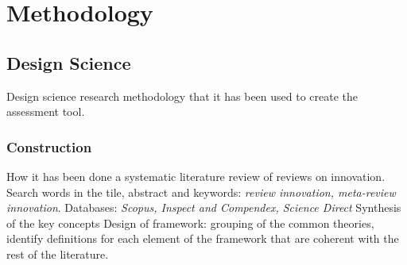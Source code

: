 
\chapter{Methodology} %

\label{Chapter3} %



\section{Design Science}



Design science research methodology that it has been used to create the assessment tool.

\subsection{Construction}
\label{subsec:Construction}
How it has been done a systematic literature review of reviews on innovation. %
Search words in the tile, abstract and keywords: \textit{review innovation, meta-review innovation}. Databases: \textit{Scopus, Inspect and Compendex, Science Direct}
Synthesis of the key concepts
Design of framework: grouping of the common theories, identify definitions for each element of the framework that are coherent with the rest of the literature.

